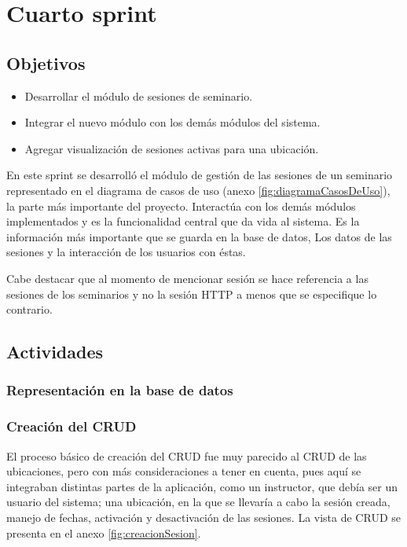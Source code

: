 ﻿\section{Cuarto sprint} %
\label{sec:cuarto_sprint}

\subsection{Objetivos}

\begin{itemize}
	\item Desarrollar el módulo de sesiones de seminario.
	\item Integrar el nuevo módulo con los demás módulos del sistema.
	\item Agregar visualización de sesiones activas para una ubicación.
\end{itemize}

En este sprint se desarrolló el módulo de gestión de las sesiones de un seminario representado en el diagrama de casos de uso (anexo \ref{fig:diagramaCasosDeUso}), la parte más importante del proyecto. Interactúa con los demás módulos implementados y es la funcionalidad central que da vida al sistema. Es la información más importante que se guarda en la base de datos, Los datos de las sesiones y la interacción de los usuarios con éstas.

Cabe destacar que al momento de mencionar sesión se hace referencia a las sesiones de los seminarios y no la sesión HTTP a menos que se especifique lo contrario.

\subsection{Actividades} %
\label{sub:actividades4}

\subsubsection{Representación en la base de datos}

\subsubsection{Creación del CRUD}

El proceso básico de creación del CRUD fue muy parecido al CRUD de las ubicaciones, pero con más consideraciones a tener en cuenta, pues aquí se integraban distintas partes de la aplicación, como un instructor, que debía ser un usuario del sistema; una ubicación, en la que se llevaría a cabo la sesión creada, manejo de fechas, activación y desactivación de las sesiones. La vista de CRUD se presenta en el anexo \ref{fig:creacionSesion}.

